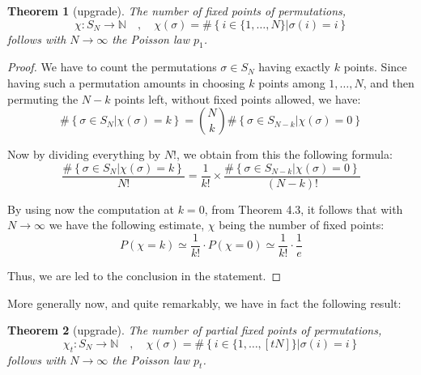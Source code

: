 \documentclass[12pt]{amsbook}
\newtheorem{theorem}{Theorem}[chapter]
\begin{document}
\begin{theorem}[upgrade]
The number of fixed points of permutations,
$$\chi:S_N\to\mathbb N\quad,\quad \chi(\sigma)=\#\left\{i\in\{1,\ldots,N\}\Big|\sigma(i)=i\right\}$$
follows with $N\to\infty$ the Poisson law $p_1$.
\end{theorem}

\begin{proof}
We have to count the permutations $\sigma\in S_N$ having exactly $k$ points. Since having such a permutation amounts in choosing $k$ points among $1,\ldots,N$, and then permuting the $N-k$ points left, without fixed points allowed, we have:
$$\#\left\{\sigma\in S_N\Big|\chi(\sigma)=k\right\}
=\binom{N}{k}\#\left\{\sigma\in S_{N-k}\Big|\chi(\sigma)=0\right\}$$

Now by dividing everything by $N!$, we obtain from this the following formula:
$$\frac{\#\left\{\sigma\in S_N\Big|\chi(\sigma)=k\right\}}{N!}=\frac{1}{k!}\times\frac{\#\left\{\sigma\in S_{N-k}\Big|\chi(\sigma)=0\right\}}{(N-k)!}$$

By using now the computation at $k=0$, from Theorem 4.3, it follows that with $N\to\infty$ we have the following estimate, $\chi$ being the number of fixed points:
$$P(\chi=k)
\simeq\frac{1}{k!}\cdot P(\chi=0)
\simeq\frac{1}{k!}\cdot\frac{1}{e}$$

Thus, we are led to the conclusion in the statement.
\end{proof}

More generally now, and quite remarkably, we have in fact the following result:


\begin{theorem}[upgrade]
The number of partial fixed points of permutations,
$$\chi_t:S_N\to\mathbb N\quad,\quad \chi(\sigma)=\#\left\{i\in\{1,\ldots,[tN]\}\Big|\sigma(i)=i\right\}$$
follows with $N\to\infty$ the Poisson law $p_t$.
\end{theorem}
\end{document}
